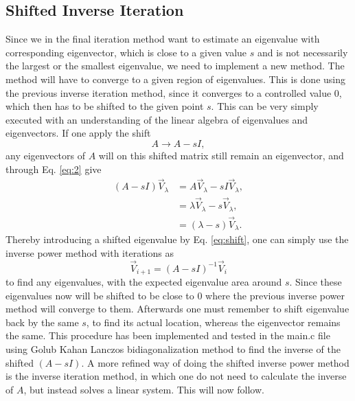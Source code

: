 \documentclass[twocolumn]{article}
\begin{document}
\subsection{\label{sec:3} Shifted Inverse Iteration}
Since we in the final iteration method want to estimate an eigenvalue with corresponding eigenvector, which is close to a given value $s$ and is not necessarily the largest or the smallest eigenvalue, we need to implement a new method. The method will have to converge to a given region of eigenvalues. This is done using the previous inverse iteration method, since it converges to a controlled value $0$, which then has to be shifted to the given point $s$.
This can be very simply executed with an understanding of the linear algebra of eigenvalues and eigenvectors. If one apply the shift
\begin{equation}
A \rightarrow A - sI, \label{eq:shift}
\end{equation}
any eigenvectors of $A$ will on this shifted matrix still remain an eigenvector, and through Eq. \eqref{eq:2} give
\begin{align}
\left(A - s I\right) \vec{V}_\lambda &=  A \vec{V}_\lambda - s I \vec{V}_\lambda, \\
 &= \lambda \vec{V}_\lambda  -  s \vec{V}_\lambda, \\
 &= \left(\lambda - s\right) \vec{V}_\lambda.
\end{align}
Thereby introducing a shifted eigenvalue by Eq. \eqref{eq:shift}, one can simply use the inverse power method with iterations as
\begin{equation}
\vec{V}_{i+1} = \left(A - sI\right)^{-1} \vec{V}_i \label{eq:6}
\end{equation}
to find any eigenvalues, with the expected eigenvalue area around $s$. Since these eigenvalues now will be shifted to be close to $0$ where the previous inverse power method will converge to them. Afterwards one must remember to shift eigenvalue back by the same $s$, to find its actual location, whereas the eigenvector remains the same. This procedure has been implemented and tested in the main.c file using Golub Kahan Lanczos bidiagonalization method to find the inverse of the shifted $\left( A - sI \right)$.
A more refined way of doing the shifted inverse power method is the inverse iteration method, in which one do not need to calculate the inverse of $A$, but instead solves a linear system. This will now follow.
\end{document}
